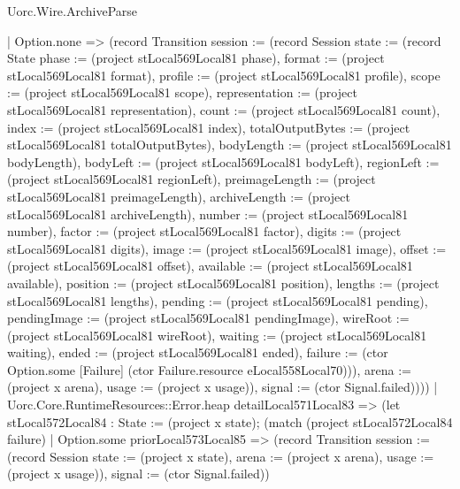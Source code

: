 \begin{lexlean}{Uorc.Wire.ArchiveParse}
\begin{semanticmodule}
{        | Option.none => (record Transition {session := (record Session {state := (record State {phase := (project stLocal569Local81 phase), format := (project stLocal569Local81 format), profile := (project stLocal569Local81 profile), scope := (project stLocal569Local81 scope), representation := (project stLocal569Local81 representation), count := (project stLocal569Local81 count), index := (project stLocal569Local81 index), totalOutputBytes := (project stLocal569Local81 totalOutputBytes), bodyLength := (project stLocal569Local81 bodyLength), bodyLeft := (project stLocal569Local81 bodyLeft), regionLeft := (project stLocal569Local81 regionLeft), preimageLength := (project stLocal569Local81 preimageLength), archiveLength := (project stLocal569Local81 archiveLength), number := (project stLocal569Local81 number), factor := (project stLocal569Local81 factor), digits := (project stLocal569Local81 digits), image := (project stLocal569Local81 image), offset := (project stLocal569Local81 offset), available := (project stLocal569Local81 available), position := (project stLocal569Local81 position), lengths := (project stLocal569Local81 lengths), pending := (project stLocal569Local81 pending), pendingImage := (project stLocal569Local81 pendingImage), wireRoot := (project stLocal569Local81 wireRoot), waiting := (project stLocal569Local81 waiting), ended := (project stLocal569Local81 ended), failure := (ctor Option.some [Failure] (ctor Failure.resource eLocal558Local70))}), arena := (project x arena), usage := (project x usage)}), signal := (ctor Signal.failed)})))
      | Uorc.Core.RuntimeResources::Error.heap detailLocal571Local83 => (let stLocal572Local84 : State := (project x state); (match (project stLocal572Local84 failure)
        | Option.some priorLocal573Local85 => (record Transition {session := (record Session {state := (project x state), arena := (project x arena), usage := (project x usage)}), signal := (ctor Signal.failed)})
}
\end{semanticmodule}
\end{lexlean}
